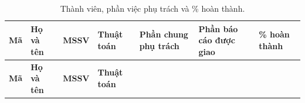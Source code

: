 \begin{longtable}[]{@{}
  >{\raggedright\arraybackslash}p{}
  >{\raggedright\arraybackslash}p{}
  >{\raggedright\arraybackslash}p{}
  >{\raggedright\arraybackslash}p{}
  >{\raggedright\arraybackslash}p{}
  >{\raggedright\arraybackslash}p{}
  >{\raggedright\arraybackslash}p{}@{}}
\caption{ Thành viên, phần việc phụ trách và \% hoàn thành.}\tabularnewline
\toprule\noalign{}
\rowcolor{tablehead}\begin{minipage}[b]{\linewidth}\raggedright
\textbf{Mã}
\end{minipage} & \begin{minipage}[b]{\linewidth}\raggedright
\textbf{Họ và tên}
\end{minipage} & \begin{minipage}[b]{\linewidth}\raggedright
\textbf{MSSV}
\end{minipage} & \begin{minipage}[b]{\linewidth}\raggedright
\textbf{Thuật toán}
\end{minipage} & \begin{minipage}[b]{\linewidth}\raggedright
\textbf{Phần chung phụ trách}
\end{minipage} & \begin{minipage}[b]{\linewidth}\raggedright
\textbf{Phần báo cáo được giao}
\end{minipage} & \begin{minipage}[b]{\linewidth}\raggedright
\textbf{\% hoàn thành}
\end{minipage} \\
\midrule\noalign{}
\endfirsthead
\toprule\noalign{}
\rowcolor{tablehead}\begin{minipage}[b]{\linewidth}\raggedright
\textbf{Mã}
\end{minipage} & \begin{minipage}[b]{\linewidth}\raggedright
\textbf{Họ và tên}
\end{minipage} & \begin{minipage}[b]{\linewidth}\raggedright
\textbf{MSSV}
\end{minipage} & \begin{minipage}[b]{\linewidth}\raggedright
\textbf{Thuật toán}

\end{minipage}
\end{longtable}
